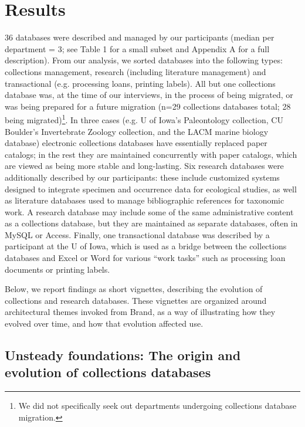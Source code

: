 \section{Results}

36 databases were described and managed by our participants (median per department = 3; see Table 1 for a small subset and Appendix A for a full description). From our analysis, we sorted databases into the following types: collections management, research (including literature management) and transactional (e.g. processing loans, printing labels). All but one collections database was, at the time of our interviews, in the process of being migrated, or was being prepared for a future migration (n=29 collections databases total; 28 being migrated)\footnote{We did not specifically seek out departments undergoing collections database migration.}. 
In three cases (e.g. U of Iowa’s Paleontology collection, CU Boulder’s Invertebrate Zoology collection, and the LACM marine biology database) electronic collections databases have essentially replaced paper catalogs; in the rest they are maintained concurrently with paper catalogs, which are viewed as being more stable and long-lasting. 
Six research databases were additionally described by our participants: these include customized systems designed to integrate specimen and occurrence data for ecological studies, as well as literature databases used to manage bibliographic references for taxonomic work. A research database may include some of the same administrative content as a collections database, but they are maintained as separate databases, often in MySQL or Access. Finally, one transactional database was described by a participant at the U of Iowa, which is used as a bridge between the collections databases and Excel or Word for various “work tasks” such as processing loan documents or printing labels. 

Below, we report findings as short vignettes, describing the evolution of collections and research databases. These vignettes are organized around architectural themes invoked from Brand, as a way of illustrating how they evolved over time, and how that evolution affected use.

\subsection{Unsteady foundations: The origin and evolution of collections databases}

